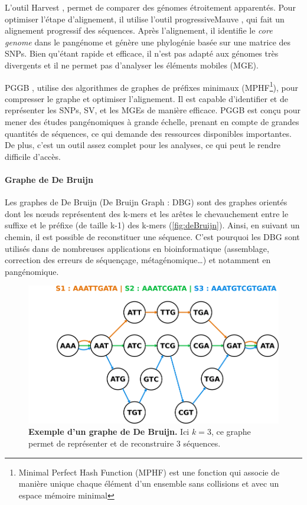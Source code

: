 L'outil Harvest \cite{treangen_harvest_2014}, permet de comparer des génomes étroitement apparentés. Pour optimiser l'étape d'alignement, il utilise l'outil progressiveMauve \cite{darling_progressivemauve_2010}, qui fait un alignement progressif des séquences. Après l'alignement, il identifie le \textit{core genome} dans le pangénome et génère une phylogénie basée sur une matrice des SNPs. Bien qu'étant rapide et efficace, il n'est pas adapté aux génomes très divergents et il ne permet pas d'analyser les éléments mobiles (MGE).

PGGB \cite{garrison_building_2024}, utilise des algorithmes de graphes de préfixes minimaux (MPHF\footnote{Minimal Perfect Hash Function (MPHF) est une fonction qui associe de manière unique chaque élément d’un ensemble sans collisions et avec un espace mémoire minimal}), pour compresser le graphe et optimiser l'alignement. Il est capable d'identifier et de représenter les SNPs, SV, et les MGEs de manière efficace. PGGB est conçu pour mener des études pangénomiques à grande échelle, prenant en compte de grandes quantités de séquences, ce qui demande des ressources disponibles importantes. De plus, c'est un outil assez complet pour les analyses, ce qui peut le rendre difficile d'accès.

\paragraph{Graphe de De Bruijn}

Les graphes de De Bruijn (De Bruijn Graph : DBG) sont des graphes orientés dont les n\oe uds représentent des k-mers et les arêtes le chevauchement entre le suffixe et le préfixe (de taille k-1) des k-mers (\autoref{fig:deBruijn}). Ainsi, en suivant un chemin, il est possible de reconstituer une séquence. C'est pourquoi les DBG sont utilisés dans de nombreuses applications en bioinformatique (assemblage, correction des erreurs de séquençage, métagénomique\dots) et notamment en pangénomique.

\begin{figure}[htbp]
    \centering
    \includegraphics[width=.9\linewidth]{images/DBG.png}
    \caption[Exemple d'un graphe de De Bruijn]{\textbf{Exemple d'un graphe de De Bruijn.} Ici $k=3$, ce graphe permet de représenter et de reconstruire 3 séquences.}
    \label{fig:deBruijn}
\end{figure}

